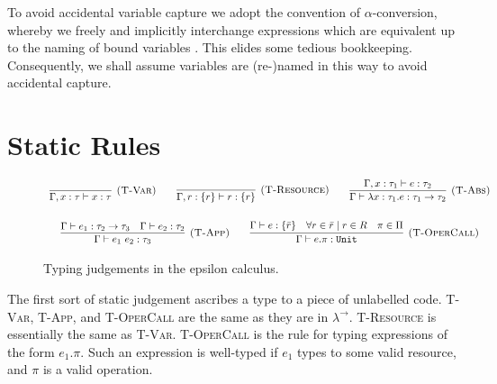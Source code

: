 To avoid accidental variable capture we adopt the convention of $\alpha$-conversion, whereby we freely and implicitly interchange expressions which are equivalent up to the naming of bound variables \cite[p. 71]{tapl}. This elides some tedious bookkeeping. Consequently, we shall assume variables are (re-)named in this way to avoid accidental capture.



\section{Static Rules}

\begin{figure}[h]


\[
\begin{array}{c}


\infer[\textsc{(T-Var)}]
	{\Gamma, x: \tau \vdash x: \tau}
	{}
~~~~~~
\infer[\textsc{(T-Resource)}]
	{\Gamma, r: \{ r \} \vdash r : \{ r \}}
	{}

~~~~~~
\infer[\textsc{(T-Abs)}]
	{\Gamma \vdash \lambda x: \tau_1.e : \tau_1 \rightarrow \tau_2}
	{\Gamma, x: \tau_1 \vdash e: \tau_2}\\[4ex]
	
\infer[\textsc{(T-App)}]
	{\Gamma \vdash e_1~e_2: \tau_3}
	{\Gamma \vdash e_1: \tau_2 \rightarrow \tau_3 & \Gamma \vdash e_2: \tau_2}
~~~~~~
\infer[\textsc{(T-OperCall)}]
	{\Gamma \vdash e.\pi: \kwa{Unit}}
	{\Gamma \vdash e: \{ \bar r \} & \forall r \in \bar r \mid r \in R & \pi \in \Pi}

\end{array}
\]

\vspace{-7pt}
\caption{Typing judgements in the epsilon calculus.}
\label{This is the label.}
\end{figure}

\noindent

\noindent
The first sort of static judgement ascribes a type to a piece of unlabelled code. \textsc{T-Var}, \textsc{T-App}, and \textsc{T-OperCall} are the same as they are in $\lambda^{\rightarrow}$. \textsc{T-Resource} is essentially the same as \textsc{T-Var}. \textsc{T-OperCall} is the rule for typing expressions of the form $e_1.\pi$. Such an expression is well-typed if $e_1$ types to some valid resource, and $\pi$ is a valid operation.


